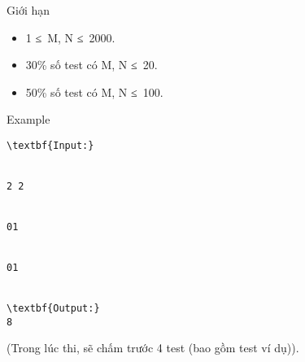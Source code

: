Giới hạn
\begin{itemize}
	\item     1 ≤ M, N ≤ 2000.   
	\item     30\% số test có M, N ≤ 20.   
	\item     50\% số test có M, N ≤ 100.   
\end{itemize}
\begin{itemize}
\end{itemize}
Example
\begin{verbatim}
\textbf{Input:}


2 2


01


01


\textbf{Output:}
8\end{verbatim}

(Trong lúc thi, sẽ chấm trước 4 test (bao gồm test ví dụ)).